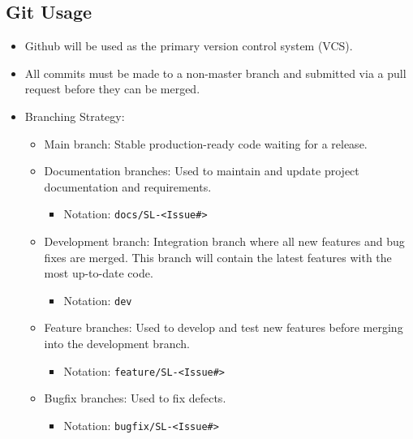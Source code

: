 \documentclass{article}
\begin{document}
\subsection{Git Usage}
\begin{itemize}
	\item Github will be used as the primary version control system (VCS).
    \item All commits must be made to a non-master branch and submitted via a pull request before they can be merged.
    \item Branching Strategy: \begin{itemize}
    \item Main branch: Stable production-ready code waiting for a release.
    \item Documentation branches: Used to maintain and update project documentation and requirements.
        \begin{itemize}
            \item Notation: \texttt{docs/SL-<Issue\#>}
        \end{itemize}

    \item Development branch: Integration branch where all new features and bug fixes are merged. This branch will contain the latest features with the most up-to-date code. 
        \begin{itemize}
            \item Notation: \texttt{dev}
        \end{itemize}

    \item Feature branches: Used to develop and test new features before merging into the development branch. 
        \begin{itemize}
            \item Notation: \texttt{feature/SL-<Issue\#>}
        \end{itemize}

    \item Bugfix branches: Used to fix defects.
        \begin{itemize}
            \item Notation: \texttt{bugfix/SL-<Issue\#>}
        \end{itemize}
\end{itemize}
\end{itemize}
\end{document}

